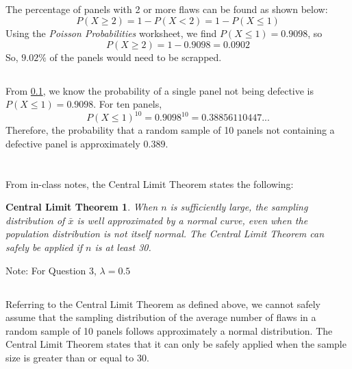 \documentclass[letterpaper]{article}
\newtheorem*{clt}{Central Limit Theorem}
\begin{document}
\subsection{}%
\label{2b}
The percentage of panels with 2 or more flaws can be found as shown below:
$$P(X\geq2)=1-P(X<2) = 1-P(X\leq1)$$
Using the \textit{Poisson Probabilities} worksheet,
we find $P(X\leq1)=0.9098$, so
$$P(X\geq2) = 1-0.9098 = 0.0902 $$
So, $9.02\%$ of the panels would need to be scrapped.


\subsection{}%
\label{2c}
From \ref{2b}, we know the probability of a single panel not being defective is $P(X\leq1)=0.9098$.
For ten panels, $$ P(X\leq1)^{10} = 0.9098^{10} = 0.38856110447...$$
Therefore, the probability that a random sample of 10 panels not containing
a defective panel is approximately $0.389$.


\section{}%
From in-class notes, the Central Limit Theorem states the following:
\begin{clt}
 When $n$ is sufficiently large, the sampling distribution of $\bar{x}$ is well
 approximated by a normal curve, even when the population distribution is not
 itself normal. The Central Limit Theorem can safely be applied if $n$ is at
 least 30.
\end{clt}

Note: For Question 3, $\lambda=0.5$
\subsection{}%
\label{3a}
Referring to the Central Limit Theorem as defined above, we cannot safely assume
that the sampling distribution of the average number of flaws in a random sample
of 10 panels follows approximately a normal distribution. The Central Limit
Theorem states that it can only be safely applied when the sample size is
greater than or equal to 30.
\end{document}
